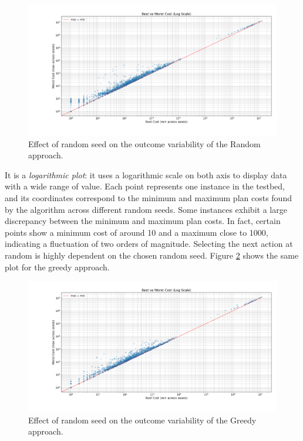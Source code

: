 \begin{figure}[ht]
	\centering
	\includegraphics[width=\textwidth]{images/randomization_random.png}
	\caption{Effect of random seed on the outcome variability of the Random approach.}
	\label{fig:rand_rand}
\end{figure}

It is a \textit{logarithmic plot}: it uses a logarithmic scale on both axis to display data with a wide range of value.
Each point represents one instance in the testbed, and its coordinates correspond to the minimum and maximum plan costs found
by the algorithm across different random seeds.
Some instances exhibit a large discrepancy between the minimum and maximum plan costs. In fact, certain points show a minimum
cost of around 10 and a maximum close to 1000, indicating a fluctuation of two orders of magnitude.
Selecting the next action at random is highly dependent on the chosen random seed.
Figure \ref{fig:rand_greedy} shows the same plot for the greedy approach.

\begin{figure}[ht]
	\centering
	\includegraphics[width=\textwidth]{images/randomization_greedy.png}
	\caption{Effect of random seed on the outcome variability of the Greedy approach.}
	\label{fig:rand_greedy}
\end{figure}

